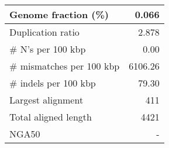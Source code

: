 \documentclass[12pt,a4paper]{article}
\begin{document}
\begin{table}[ht]
\begin{center}
\begin{tabular}{|l*{1}{|r}|}
Genome fraction (\%) & 0.066 \\ \hline
Duplication ratio & 2.878 \\ \hline
\# N's per 100 kbp & 0.00 \\ \hline
\# mismatches per 100 kbp & 6106.26 \\ \hline
\# indels per 100 kbp & 79.30 \\ \hline
Largest alignment & 411 \\ \hline
Total aligned length & 4421 \\ \hline
NGA50 & - \\ \hline
\end{tabular}
\end{center}
\end{table}
\end{document}
